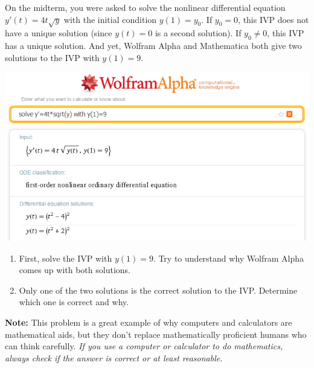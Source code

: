 \documentclass[12pt,letterpaper]{hmcpset}
\begin{document}

\begin{problem}[1]
    On the midterm, you were asked to solve the nonlinear differential equation $y'(t)=4t\sqrt{y}$ with the initial condition $y(1)=y_0$.  If $y_0=0$, this IVP does not have a unique solution (since $y(t)=0$ is a second solution). If $y_0\neq 0$, this IVP has a unique solution. And yet, Wolfram Alpha and Mathematica both give two solutions to the IVP with $y(1)=9$.

    \begin{center}
        \includegraphics[width=6in,keepaspectratio=true]{img/apr_22_1_wolfram_.png}
    \end{center}

    \begin{enumerate}
        \item First, solve the IVP with $y(1)=9$. Try to understand why Wolfram Alpha comes up with both solutions.
        \item Only one of the two solutions is the correct solution to the IVP.  Determine which one is correct and why.
    \end{enumerate}
    \textbf{Note:} This problem is a great example of why computers and calculators are mathematical aids, but they don't replace mathematically proficient humans who can think carefully. \textit{If you use a computer or calculator to do mathematics, always check if the answer is correct or at least reasonable.}
\end{problem}

\newpage
\begin{solution}
    \null\vfill
\end{solution}
\newpage
\end{document}
